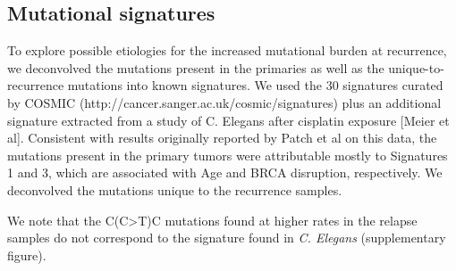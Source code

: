 \subsection*{Mutational signatures}
To explore possible etiologies for the increased mutational burden at recurrence, we deconvolved the mutations present in the primaries as well as the unique-to-recurrence mutations into known signatures. We used the 30 signatures curated by COSMIC (http://cancer.sanger.ac.uk/cosmic/signatures) plus an additional signature extracted from a study of C. Elegans after cisplatin exposure [Meier et al]. Consistent with results originally reported by Patch et al on this data, the mutations present in the primary tumors were attributable mostly to Signatures 1 and 3, which are associated with Age and BRCA disruption, respectively. We deconvolved the mutations unique to the recurrence samples. 

We note that the C(C>T)C mutations found at higher rates in the relapse samples do not correspond to the signature found in \textit{C. Elegans} (supplementary figure).

